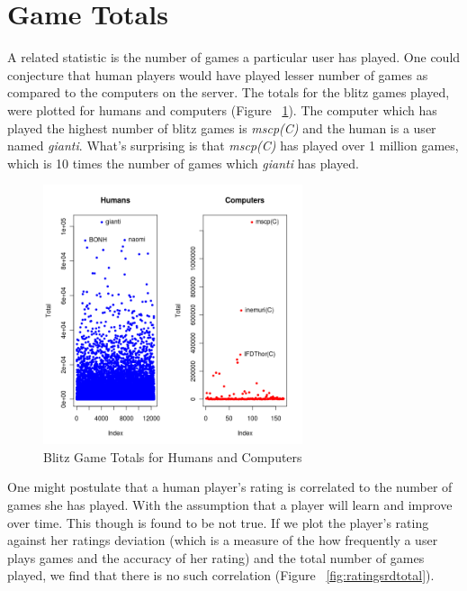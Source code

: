 \documentclass{article}
\begin{document}
\section{Game Totals}

A related statistic is the number of games a particular user has played. One could conjecture that human players would have played lesser number of games as compared to the computers on the server. The totals for the blitz games played, were plotted for humans and computers (Figure ~\ref{fig:gametotals}). The computer which has played the highest number of blitz games is {\sl mscp(C)} and the human is a user named {\sl gianti}. What's surprising is that {\sl mscp(C)} has played over 1 million games, which is 10 times the number of games which {\sl gianti} has played.\\


\begin{figure} [htp]
\begin{center}
\includegraphics[width=3in]{game_totals.png}
\end{center}
\caption{Blitz Game Totals for Humans and Computers}
\label{fig:gametotals}
\end{figure}



One might postulate that a human player's rating is correlated to the number of games she has played. With the assumption that a player will learn and improve over time. This though is found to be not true. If we plot the player's rating against her ratings deviation (which is a measure of the how frequently a user plays games and the accuracy of her rating) and the total number of games played, we find that there is no such correlation (Figure ~\ref{fig:ratingsrdtotal}).\\
\end{document}

